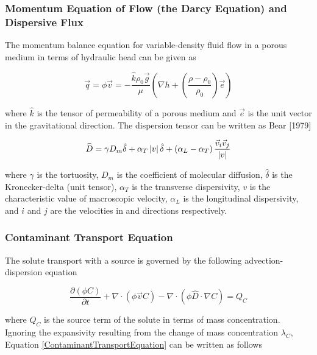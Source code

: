\subsubsection[Momentum Equation of Flow and Dispersive Flux]{Momentum Equation of Flow (the Darcy Equation) and Dispersive Flux}\label{SS:MomentumAndDispersion}
The momentum balance equation for variable-density fluid flow in a
porous medium in terms of hydraulic head can be given as

\begin{equation}\label{DarcyEquation}
\vec q = \phi \vec v =  - \frac{{\hat k\rho _0 \vec g}}{\mu }\left(
{\nabla h + \left( {\frac{{\rho  - \rho _0 }}{{\rho _0 }}}
\right)\vec e} \right)
\end{equation}

where $\hat k$ is the tensor of permeability of a porous medium and
$\vec e$ is the unit vector in the gravitational direction. The
dispersion tensor can be written as Bear [1979]

\begin{equation}\label{DispersiveFlux}
\mathord{\buildrel{\lower3pt\hbox{$\scriptscriptstyle\frown$}} \over
D}  = \gamma D_m \hat \delta  + \alpha _T \left| v \right|\hat
\delta  + \left( {\alpha _L  - \alpha _T } \right)\frac{{\vec v_i
\vec v_j }}{{\left| v \right|}}
\end{equation}

where $\gamma$ is the tortuosity, $D_m$ is the coefficient of
molecular diffusion, $\hat \delta$ is the Kronecker-delta (unit
tensor), $\alpha _T$ is the transverse dispersivity, $v$ is the
characteristic value of macroscopic velocity, $\alpha _L$ is the
longitudinal dispersivity, and $i$ and $j$ are the velocities in and
directions respectively.

\subsubsection{Contaminant Transport Equation}\label{SS:ContaminantTransport}
The solute transport with a source is governed by the following
advection-dispersion equation

\begin{equation}\label{ContaminantTransportEquation}
\frac{{\partial \left( {\phi C} \right)}}{{\partial t}} + \nabla
\cdot \left( {\phi \vec vC} \right) - \nabla  \cdot \left( {\phi
\hat D \cdot \nabla C} \right) = Q_C
\end{equation}

where $Q_C$ is the source term of the solute in terms of mass
concentration. Ignoring the expansivity resulting from the change of
mass concentration $\lambda _C$, Equation
\ref{ContaminantTransportEquation} can be written as follows

